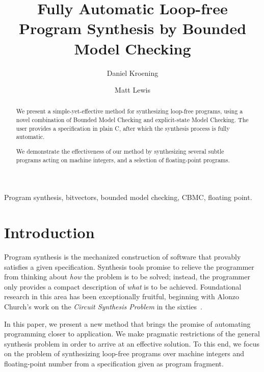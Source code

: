 \documentclass[a4paper]{llncs}
\title{Fully Automatic Loop-free Program Synthesis by Bounded Model Checking}
\author{Daniel Kroening \and Matt Lewis}
\institute{University of Oxford}
\newenvironment{keywords}{
       \list{}{\advance\topsep by0.35cm\relax\small
       \leftmargin=0cm
       \labelwidth=0.35cm
       \listparindent=0.35cm
       \itemindent\listparindent
       \rightmargin\leftmargin}\item[\hskip\labelsep
                                     \bfseries Keywords:]}
     {\endlist}
\begin{document}
%
\maketitle
%
\pagestyle{headings}  %

\begin{abstract}
We present a simple-yet-effective method for synthesizing loop-free
programs, using a novel combination of Bounded Model Checking and
explicit-state Model Checking.  The user provides a specification in plain
C, after which the synthesis process is fully automatic.

We demonstrate the effectiveness of our method by synthesizing several subtle
programs acting on machine integers, and a selection of floating-point programs.
\end{abstract}


\begin{keywords}
 Program synthesis, bitvectors, bounded model checking, CBMC,
 floating point.
\end{keywords}

\section{Introduction}

Program synthesis is the mechanized construction of software that provably
satisfies a given specification.  Synthesis tools promise to relieve the
programmer from thinking about \emph{how} the problem is to be solved;
instead, the programmer only provides a compact description of \emph{what}
is to be achieved.  Foundational research in this area has been
exceptionally fruitful, beginning with Alonzo Church's work on the
\emph{Circuit Synthesis Problem} in the sixties~\cite{church-synth}.

In this paper, we present a new method that brings the promise of
automating programming closer to application.  We make pragmatic
restrictions of the general synthesis problem in order to arrive at an
effective solution.  To this end, we focus on the problem of synthesizing
loop-free programs over machine integers and floating-point number from a
specification given as program fragment.
\end{document}
